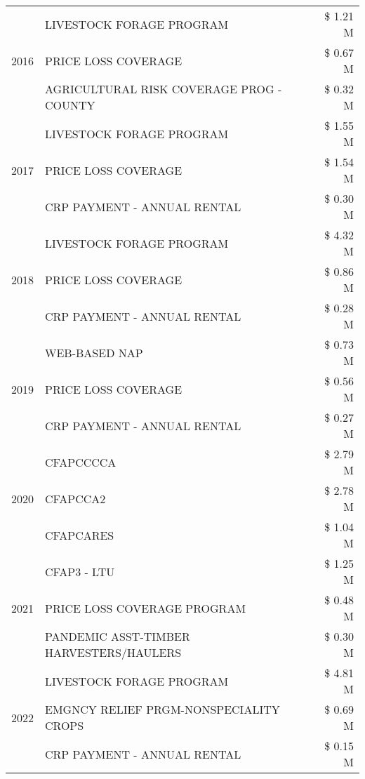 \begin{tabular}{llr}
\cline{1-3}
\multirow[t]{3}{*}{2016} & LIVESTOCK FORAGE PROGRAM & \$ 1.21 M \\
 & PRICE LOSS COVERAGE & \$ 0.67 M \\
 & AGRICULTURAL RISK COVERAGE PROG - COUNTY & \$ 0.32 M \\
\cline{1-3}
\multirow[t]{3}{*}{2017} & LIVESTOCK FORAGE PROGRAM & \$ 1.55 M \\
 & PRICE LOSS COVERAGE & \$ 1.54 M \\
 & CRP PAYMENT - ANNUAL RENTAL & \$ 0.30 M \\
\cline{1-3}
\multirow[t]{3}{*}{2018} & LIVESTOCK FORAGE PROGRAM & \$ 4.32 M \\
 & PRICE LOSS COVERAGE & \$ 0.86 M \\
 & CRP PAYMENT - ANNUAL RENTAL & \$ 0.28 M \\
\cline{1-3}
\multirow[t]{3}{*}{2019} & WEB-BASED NAP & \$ 0.73 M \\
 & PRICE LOSS COVERAGE & \$ 0.56 M \\
 & CRP PAYMENT - ANNUAL RENTAL & \$ 0.27 M \\
\cline{1-3}
\multirow[t]{3}{*}{2020} & CFAPCCCCA & \$ 2.79 M \\
 & CFAPCCA2 & \$ 2.78 M \\
 & CFAPCARES & \$ 1.04 M \\
\cline{1-3}
\multirow[t]{3}{*}{2021} & CFAP3 - LTU & \$ 1.25 M \\
 & PRICE LOSS COVERAGE PROGRAM & \$ 0.48 M \\
 & PANDEMIC ASST-TIMBER HARVESTERS/HAULERS & \$ 0.30 M \\
\cline{1-3}
\multirow[t]{3}{*}{2022} & LIVESTOCK FORAGE PROGRAM & \$ 4.81 M \\
 & EMGNCY RELIEF PRGM-NONSPECIALITY CROPS & \$ 0.69 M \\
 & CRP PAYMENT - ANNUAL RENTAL & \$ 0.15 M \\
\cline{1-3}
\bottomrule
\end{tabular}

